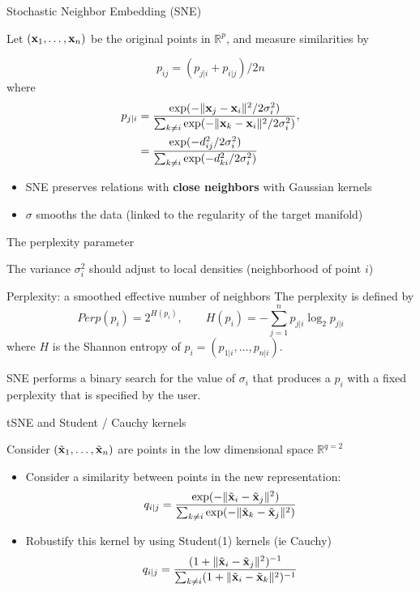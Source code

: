 \documentclass{beamer}\usepackage[]{graphicx}\usepackage[]{color}
\begin{document}
\begin{frame}{Stochastic Neighbor Embedding (SNE)}

Let $(\mathbf{x}_1, \hdots, \mathbf{x}_n)$ be the original points in $\mathbb{R}^p$, and measure similarities by

\[p_{ij} =  (p_{j | {i}} + p_{{i} | j})/ 2n\]
where
\begin{align*}
  p_{j | {i}} & = \frac{ \exp(- \| \mathbf{x}_j - \mathbf{x}_{i} \|^2 / 2 \sigma_i^2 ) }{\sum_{k \neq i} \exp(- \| \mathbf{x}_k - \mathbf{x}_{i} \|^2 / 2 \sigma_{i}^2)}, \\
  & = \frac{ \exp(- d_{ij}^2 / 2 \sigma_i^2 ) }{\sum_{k \neq i} \exp(- d_{ki}^2 / 2 \sigma_i^2)}
\end{align*}

\vfill

\begin{itemize}
\item[\rsa] SNE preserves relations with \alert{\bf close neighbors} with Gaussian kernels
\item[\rsa] $\sigma$ smooths the data (linked to the regularity of the target manifold)
\end{itemize}

\end{frame}

\begin{frame}{The perplexity parameter}

The variance $\sigma_i^2$ should adjust to local densities (neighborhood of point $i$)

\begin{block}{Perplexity: a smoothed effective number of neighbors}
The perplexity is defined by
$$
  Perp(p_i) = 2^{H(p_i)}, \qquad H(p_i) = -\sum_{j=1}^{n} p_{j|i} \log_2 p_{j|i}
$$
where $H$ is the Shannon entropy of $p_i=(p_{1|i},\hdots,p_{n|i})$.\\
\end{block}

\vfill

\rsa SNE performs a binary search for the value of $\sigma_i$ that produces a $p_i$ with a fixed perplexity that is specified by the user.

\end{frame}

\begin{frame}{tSNE and Student / Cauchy kernels}

Consider $(\tilde{\mathbf{x}}_1,\hdots,\tilde{\mathbf{x}}_n)$ are points in the low dimensional space $\mathbb{R}^{q=2}$

\begin{itemize}
\item Consider a similarity between points in the new representation:
$$q_{i | j} = \frac{ \exp(- \| \tilde{\mathbf{x}}_i - \tilde{\mathbf{x}}_j \|^2  ) }{\sum_{k \neq i} \exp(- \| \tilde{\mathbf{x}}_k - \tilde{\mathbf{x}}_j \|^2 )}$$
\item Robustify this kernel by using Student(1) kernels (ie Cauchy)
$$q_{i | j} = \frac{ (1 + \| \tilde{\mathbf{x}}_i - \tilde{\mathbf{x}}_j \|^2)^{-1}  }{\sum_{k \neq i} (1 + \| \tilde{\mathbf{x}}_i - \tilde{\mathbf{x}}_k \|^2)^{-1}}$$
\end{itemize}
\end{frame}
\end{document}
